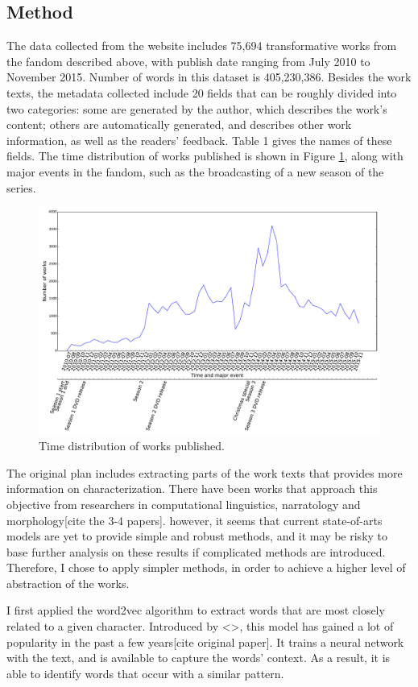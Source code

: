 \documentclass{pnastwo}
\begin{document}
\begin{article}
\section{Method}
The data collected from the website includes 75,694 transformative works from the fandom described above, 
with publish date ranging from July 2010 to November 2015. Number of words in this dataset is 405,230,386. 
Besides the work texts, the metadata collected include 20 fields that can be roughly divided into two categories: some are generated by the author, which describes the work's content; others are automatically generated, and describes other work information, as well as the readers' feedback. Table 1 gives the names of these fields. The time distribution of works published is shown in Figure \ref{time_work}, along with major events in the fandom, such as the broadcasting of a new season of the series. 

\begin{figure}
\centerline{\includegraphics[width=.5\textwidth]{time_work.pdf}}
\caption{Time distribution of works published.}\label{time_work}
\end{figure}

The original plan includes extracting parts of the work texts that provides more information on characterization. 
There have been works that approach this objective from researchers in computational linguistics, narratology and morphology[cite the 3-4 papers]. however, it seems that current state-of-arts models are yet to provide simple and robust methods, and it may be risky to base further analysis on these results if complicated methods are introduced. Therefore, I chose to apply simpler methods, in order to achieve a higher level of abstraction of the works.

I first applied the word2vec algorithm to extract words that are most closely related to a given character. Introduced by <>, this model has gained a lot of popularity in the past a few years[cite original paper]. It trains a neural network with the text, and is available to capture the words' context. As a result, it is able to identify words that occur with a similar pattern.


\end{article}
\end{document}
